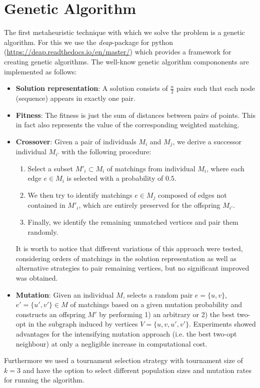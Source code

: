 \documentclass[12pt]{article}
\begin{document}
\section{Genetic Algorithm}
The first metaheuristic technique with which we solve the problem is a genetic algorithm.
For this we use the \textit{deap}-package for python (\url{https://deap.readthedocs.io/en/master/}) which provides a framework for creating genetic algorithms.
The well-know genetic algorithm compononents are implemented as follows:
\begin{itemize}
    \item \textbf{Solution representation}: A solution consists of $\frac{n}{2}$ pairs such that each node (sequence) appears in exactly one pair.
    \item \textbf{Fitness}: The fitness is just the sum of distances between pairs of points. 
    This in fact also represents the value of the corresponding weighted matching.
    \item \textbf{Crossover}: Given a pair of individuals $M_i$ and $M_j$, we derive a successor individual $M_{i'}$ with the following procedure:
    \begin{enumerate}
    	\item Select a subset $M'_i \subset M_i$ of matchings from individual $M_i$, where each edge $e \in M_i$ is selected with a probability of $0.5$. 
    	\item We then try to identify matchings $e \in M_j$ composed of edges not contained in $M'_i$, which are entirely preserved for the offspring $M_{i'}$.
    	\item Finally, we identify the remaining unmatched vertices and pair them randomly. 
    \end{enumerate}
    It is worth to notice that different variations of this approach were tested, considering orders of matchings in the solution representation as well as alternative strategies to pair remaining vertices, but no significant improved was obtained. 
    \item \textbf{Mutation}: Given an individual $M$, selects a random pair $e=\{u,v\}$, $e'=\{u',v'\} \in M$ of matchings based on a given mutation probability and constructs an offspring $M'$ by performing 1) an arbitrary or 2) the best two-opt in the subgraph induced by vertices $V=\{u,v,u',v'\}$. Experiments showed advantages for the intensifying mutation approach (i.e. the best two-opt neighbour) at only a negligible increase in computational cost. 
\end{itemize}
Furthermore we used a tournament selection strategy with tournament size of $k=3$ and have the option to select different population sizes and mutation rates for running the algorithm.
\end{document}
